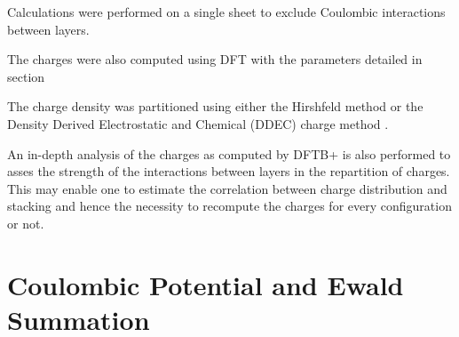 Calculations were performed on a single sheet to exclude Coulombic interactions between layers.


The charges were also computed using DFT with the parameters detailed in section%

The charge density was partitioned using either the Hirshfeld method \cite{hirshfeld_bonded-atom_1977} or the Density Derived Electrostatic and Chemical (DDEC) charge method \cite{manz_chemically_2010}.

An in-depth analysis of the charges as computed by DFTB+ is also performed to asses the strength of the interactions between layers in the repartition of charges. This may enable one to estimate the correlation between charge distribution and stacking and hence the necessity to recompute the charges for every configuration or not. 



\section{Coulombic Potential and Ewald Summation}

